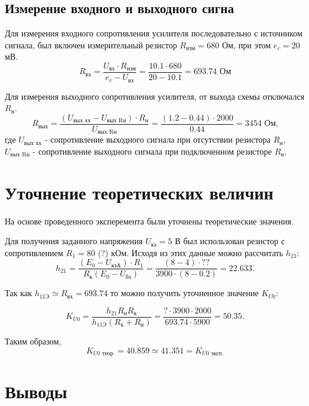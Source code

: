 \subsection{Измерение входного и выходного сигна}

Для измерения входного сопротивления усилителя последовательно с источником сигнала, был включен измерительный резистор $R_\text{изм} = 680$ Ом, при этом $e_c = 20$ мВ.
\begin{equation}
R_\text{вх} = \frac{U_\text{вх} \cdot R_\text{изм}}{e_c - U_\text{вх}} = \frac{10.1 \cdot 680}{20 - 10.1} = 693.74 \text{ Ом}
\end{equation}


Для измерения выходного сопротивления усилителя, от выхода схемы отключался $R_\text{н}$.
\begin{equation}
R_\text{вых} = \frac{(U_\text{вых хх} - U_\text{вых Rн}) \cdot R_\text{н}}{U_\text{вых Rн}} = \frac{(1.2 - 0.44) \cdot 2000}{0.44} = 3454 \text{ Ом,}
\end{equation}
где $U_\text{вых хх}$ - сопротивление выходного сигнала при отсутствии резистора $R_\text{н}$, $U_\text{вых Rн}$ - сопротивление выходного сигнала при подключенном резисторе $R_\text{н}$.

\section{Уточнение теоретических величин}

На основе проведенного эксперемента были уточнены теоретические значения.

Для получения заданного напряжения $U_\text{кэ} = 5$ В был использован резистор с сопротивлением $R_1 = 80$ (?) кОм. Исходя из этих данные можно рассчитать $h_{21}$:
\begin{equation}
h_{21} = \frac{(E_0 - U_\text{кэА}) \cdot R_1}{R_\text{к}(E_0 - U_\text{бэ})} = \frac{(8 - 4) \cdot ??}{3900 \cdot (8 - 0.2)} = 22.633.
\end{equation}

Так как $h_{11\text{Э}} \simeq R_{\text{вх}} = 693.74$ то можно получить уточненное значение $K_{U0}$: 

\begin{equation*}
K_{U0} = \frac{h_{21}R_\text{н}R_\text{к}}{h_\text{11Э}(R_\text{к}+R_\text{н})} = \frac{? \cdot 3900 \cdot 2000}{693.74 \cdot 5900} = 50.35.
\end{equation*}

Таким образом, 
\begin{equation*}
K_{U0\text{ теор.}} = 40.859 \simeq 41.351 = K_{U0\text{ эксп.}}
\end{equation*}

\section{Выводы}


